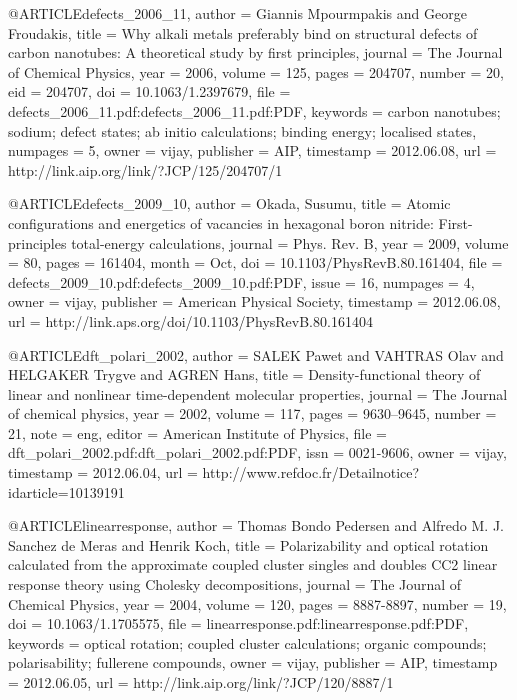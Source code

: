 @ARTICLE{defects_2006_11,
  author = {Giannis Mpourmpakis and George Froudakis},
  title = {Why alkali metals preferably bind on structural defects of carbon
	nanotubes: A theoretical study by first principles},
  journal = {The Journal of Chemical Physics},
  year = {2006},
  volume = {125},
  pages = {204707},
  number = {20},
  eid = {204707},
  doi = {10.1063/1.2397679},
  file = {defects_2006_11.pdf:defects_2006_11.pdf:PDF},
  keywords = {carbon nanotubes; sodium; defect states; ab initio calculations; binding
	energy; localised states},
  numpages = {5},
  owner = {vijay},
  publisher = {AIP},
  timestamp = {2012.06.08},
  url = {http://link.aip.org/link/?JCP/125/204707/1}
}

@ARTICLE{defects_2009_10,
  author = {Okada, Susumu},
  title = {Atomic configurations and energetics of vacancies in hexagonal boron
	nitride: First-principles total-energy calculations},
  journal = {Phys. Rev. B},
  year = {2009},
  volume = {80},
  pages = {161404},
  month = {Oct},
  doi = {10.1103/PhysRevB.80.161404},
  file = {defects_2009_10.pdf:defects_2009_10.pdf:PDF},
  issue = {16},
  numpages = {4},
  owner = {vijay},
  publisher = {American Physical Society},
  timestamp = {2012.06.08},
  url = {http://link.aps.org/doi/10.1103/PhysRevB.80.161404}
}

@ARTICLE{dft_polari_2002,
  author = {SALEK Pawet and VAHTRAS Olav and HELGAKER Trygve and AGREN Hans},
  title = {Density-functional theory of linear and nonlinear time-dependent
	molecular properties},
  journal = {The Journal of chemical physics},
  year = {2002},
  volume = {117},
  pages = {9630--9645},
  number = {21},
  note = {eng},
  editor = {American Institute of Physics},
  file = {dft_polari_2002.pdf:dft_polari_2002.pdf:PDF},
  issn = {0021-9606},
  owner = {vijay},
  timestamp = {2012.06.04},
  url = {http://www.refdoc.fr/Detailnotice?idarticle=10139191}
}

@ARTICLE{linearresponse,
  author = {Thomas Bondo Pedersen and Alfredo M. J. Sanchez de Meras and Henrik
	Koch},
  title = {Polarizability and optical rotation calculated from the approximate
	coupled cluster singles and doubles CC2 linear response theory using
	Cholesky decompositions},
  journal = {The Journal of Chemical Physics},
  year = {2004},
  volume = {120},
  pages = {8887-8897},
  number = {19},
  doi = {10.1063/1.1705575},
  file = {linearresponse.pdf:linearresponse.pdf:PDF},
  keywords = {optical rotation; coupled cluster calculations; organic compounds;
	polarisability; fullerene compounds},
  owner = {vijay},
  publisher = {AIP},
  timestamp = {2012.06.05},
  url = {http://link.aip.org/link/?JCP/120/8887/1}
}

